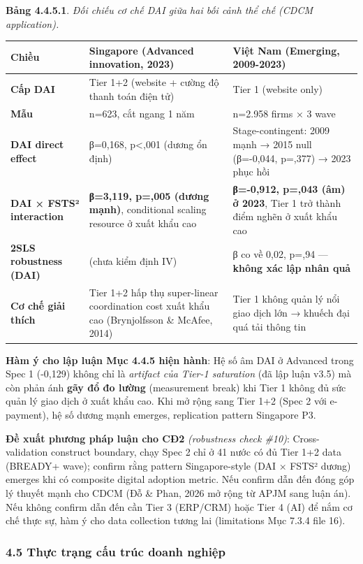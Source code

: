 \documentclass[12pt,a4paper]{article}
\begin{document}
\textbf{Bảng 4.4.5.1}. \emph{Đối chiếu cơ chế DAI giữa hai bối cảnh thể
chế (CDCM application).}

\begin{longtable}[]{@{}lll@{}}
\toprule\noalign{}
Chiều & Singapore (Advanced innovation, 2023) & Việt Nam (Emerging,
2009-2023) \\
\midrule\noalign{}
\endhead
\bottomrule\noalign{}
\endlastfoot
\textbf{Cấp DAI} & Tier 1+2 (website + cường độ thanh toán điện tử) &
Tier 1 (website only) \\
\textbf{Mẫu} & n=623, cắt ngang 1 năm & n=2.958 firms × 3 wave \\
\textbf{DAI direct effect} & β=0,168, p\textless,001 (dương ổn định) &
Stage-contingent: 2009 mạnh → 2015 null (β=-0,044, p=,377) → 2023 phục
hồi \\
\textbf{DAI × FSTS² interaction} & \textbf{β=3,119, p=,005 (dương
mạnh)}, conditional scaling resource ở xuất khẩu cao & \textbf{β=-0,912,
p=,043 (âm) ở 2023}, Tier 1 trở thành điểm nghẽn ở xuất khẩu cao \\
\textbf{2SLS robustness (DAI)} & (chưa kiểm định IV) & β co về 0,02,
p=,94 --- \textbf{không xác lập nhân quả} \\
\textbf{Cơ chế giải thích} & Tier 1+2 hấp thụ super-linear coordination
cost xuất khẩu cao (Brynjolfsson \& McAfee, 2014) & Tier 1 không quản lý
nổi giao dịch lớn → khuếch đại quá tải thông tin \\
\end{longtable}

\textbf{Hàm ý cho lập luận Mục 4.4.5 hiện hành}: Hệ số âm DAI ở Advanced
trong Spec 1 (-0,129) không chỉ là \emph{artifact của Tier-1 saturation}
(đã lập luận v3.5) mà còn phản ánh \textbf{gãy đổ đo lường} (measurement
break) khi Tier 1 không đủ sức quản lý giao dịch ở xuất khẩu cao. Khi mở
rộng sang Tier 1+2 (Spec 2 với e-payment), hệ số dương mạnh emerges,
replication pattern Singapore P3.

\textbf{Đề xuất phương pháp luận cho CĐ2} \emph{(robustness check
\#10)}: Cross-validation construct boundary, chạy Spec 2 chỉ ở 41 nước
có đủ Tier 1+2 data (BREADY+ wave); confirm rằng pattern Singapore-style
(DAI × FSTS² dương) emerges khi có composite digital adoption metric.
Nếu confirm dẫn đến đóng góp lý thuyết mạnh cho CDCM (Đỗ \& Phan, 2026
mở rộng từ APJM sang luận án). Nếu không confirm dẫn đến cần Tier 3
(ERP/CRM) hoặc Tier 4 (AI) để nắm cơ chế thực sự, hàm ý cho data
collection tương lai (limitations Mục 7.3.4 file 16).

\hypertarget{45-thux1ef1c-trux1ea1ng-cux1ea5u-truxfac-doanh-nghiux1ec7p}{%
\subsubsection{4.5 Thực trạng cấu trúc doanh
nghiệp}\label{45-thux1ef1c-trux1ea1ng-cux1ea5u-truxfac-doanh-nghiux1ec7p}}
\end{document}
